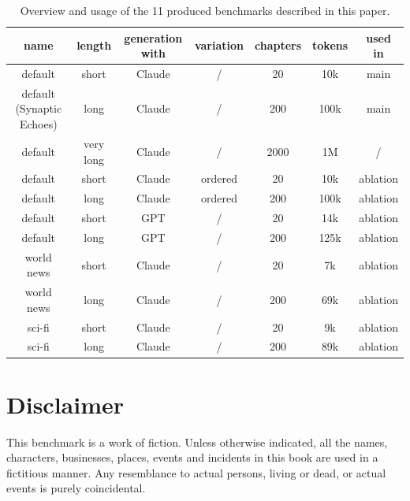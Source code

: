\documentclass{article}
\begin{document}
\begin{table}[t]
\caption{Overview and usage of the 11 produced benchmarks described in this paper.}
\centering
\label{tab:overview}
\begin{small}
\begin{tabular}{@{}ccccccc@{}}
\toprule
name & length & generation with & variation & chapters & tokens & used in \\ \midrule
default & short & Claude & / & 20 & 10k & main\\
default (Synaptic Echoes) & long & Claude & / & 200 & 100k & main\\
default & very long & Claude & / & 2000 & 1M  & /\\
default & short & Claude & ordered & 20 & 10k  & ablation \\
default & long & Claude & ordered & 200 & 100k  & ablation\\
default & short & GPT & / & 20 & 14k  & ablation\\
default & long & GPT & / & 200 & 125k  & ablation\\
world news & short & Claude & / & 20 & 7k  & ablation\\
world news & long & Claude & / & 200 & 69k  & ablation\\
sci-fi & short & Claude & / & 20 & 9k  & ablation\\
sci-fi & long & Claude & / & 200 & 89k  & ablation\\ \bottomrule
\end{tabular}
\end{small}
\end{table}


\section{Disclaimer}
 This benchmark is a work of fiction. Unless otherwise indicated, all the names, characters, businesses, places, events and incidents in this book are used in a fictitious manner. Any resemblance to actual persons, living or dead, or actual events is purely coincidental.
\end{document}
